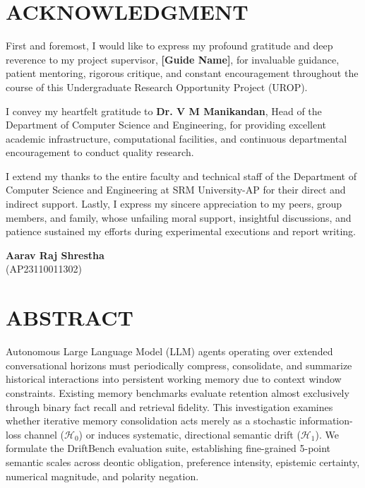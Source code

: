 \documentclass[12pt,a4paper]{report}
\begin{document}
\clearpage

\chapter*{ACKNOWLEDGMENT}

First and foremost, I would like to express my profound gratitude and deep reverence to my project supervisor, \textbf{[Guide Name]}, for invaluable guidance, patient mentoring, rigorous critique, and constant encouragement throughout the course of this Undergraduate Research Opportunity Project (UROP). 

I convey my heartfelt gratitude to \textbf{Dr. V M Manikandan}, Head of the Department of Computer Science and Engineering, for providing excellent academic infrastructure, computational facilities, and continuous departmental encouragement to conduct quality research.

I extend my thanks to the entire faculty and technical staff of the Department of Computer Science and Engineering at SRM University-AP for their direct and indirect support. Lastly, I express my sincere appreciation to my peers, group members, and family, whose unfailing moral support, insightful discussions, and patience sustained my efforts during experimental executions and report writing.

\vspace{1.5cm}
\begin{flushright}
\textbf{Aarav Raj Shrestha}\\
(AP23110011302)
\end{flushright}

\clearpage

\chapter*{ABSTRACT}

Autonomous Large Language Model (LLM) agents operating over extended conversational horizons must periodically compress, consolidate, and summarize historical interactions into persistent working memory due to context window constraints. Existing memory benchmarks evaluate retention almost exclusively through binary fact recall and retrieval fidelity. This investigation examines whether iterative memory consolidation acts merely as a stochastic information-loss channel ($\mathcal{H}_0$) or induces systematic, directional semantic drift ($\mathcal{H}_1$). We formulate the DriftBench evaluation suite, establishing fine-grained 5-point semantic scales across deontic obligation, preference intensity, epistemic certainty, numerical magnitude, and polarity negation.
\end{document}
